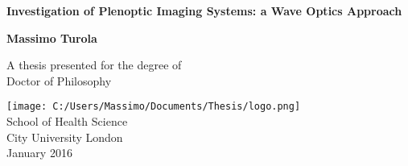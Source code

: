 \begin{titlepage}
    \begin{center}
        \vspace*{1cm}
        \LARGE
        \textbf{Investigation of Plenoptic Imaging Systems: a Wave Optics Approach}
        
        \large
        \vspace{1cm}
        \Large
        \textbf{Massimo Turola}
       
        \vfill
        \large
        A thesis presented for the degree of\\
        Doctor of Philosophy
        
        \vspace{0.8cm}
        
        \texttt{[image: C:/Users/Massimo/Documents/Thesis/logo.png]}
        \\
        \large
        School of Health Science\\
        City University London\\
        January 2016
        
    \end{center}
\end{titlepage}
